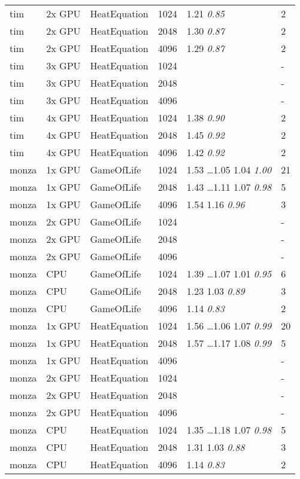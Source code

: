 \begin{tabular}{| l | l | l | l | l | l |}
tim & 2x GPU & HeatEquation & 1024 & 1.21 \textit{0.85} & 2 \\
tim & 2x GPU & HeatEquation & 2048 & 1.30 \textit{0.87} & 2 \\
tim & 2x GPU & HeatEquation & 4096 & 1.29 \textit{0.87} & 2 \\
tim & 3x GPU & HeatEquation & 1024 &  & - \\
tim & 3x GPU & HeatEquation & 2048 &  & - \\
tim & 3x GPU & HeatEquation & 4096 &  & - \\
tim & 4x GPU & HeatEquation & 1024 & 1.38 \textit{0.90} & 2 \\
tim & 4x GPU & HeatEquation & 2048 & 1.45 \textit{0.92} & 2 \\
tim & 4x GPU & HeatEquation & 4096 & 1.42 \textit{0.92} & 2 \\
monza & 1x GPU & GameOfLife & 1024 & 1.53 \ldots 1.05 1.04 \textit{1.00} & 21 \\
monza & 1x GPU & GameOfLife & 2048 & 1.43 \ldots 1.11 1.07 \textit{0.98} & 5 \\
monza & 1x GPU & GameOfLife & 4096 & 1.54 1.16 \textit{0.96} & 3 \\
monza & 2x GPU & GameOfLife & 1024 &  & - \\
monza & 2x GPU & GameOfLife & 2048 &  & - \\
monza & 2x GPU & GameOfLife & 4096 &  & - \\
monza & CPU & GameOfLife & 1024 & 1.39 \ldots 1.07 1.01 \textit{0.95} & 6 \\
monza & CPU & GameOfLife & 2048 & 1.23 1.03 \textit{0.89} & 3 \\
monza & CPU & GameOfLife & 4096 & 1.14 \textit{0.83} & 2 \\
monza & 1x GPU & HeatEquation & 1024 & 1.56 \ldots 1.06 1.07 \textit{0.99} & 20 \\
monza & 1x GPU & HeatEquation & 2048 & 1.57 \ldots 1.17 1.08 \textit{0.99} & 5 \\
monza & 1x GPU & HeatEquation & 4096 &  & - \\
monza & 2x GPU & HeatEquation & 1024 &  & - \\
monza & 2x GPU & HeatEquation & 2048 &  & - \\
monza & 2x GPU & HeatEquation & 4096 &  & - \\
monza & CPU & HeatEquation & 1024 & 1.35 \ldots 1.18 1.07 \textit{0.98} & 5 \\
monza & CPU & HeatEquation & 2048 & 1.31 1.03 \textit{0.88} & 3 \\
monza & CPU & HeatEquation & 4096 & 1.14 \textit{0.83} & 2 \\
\hline
\end{tabular}
